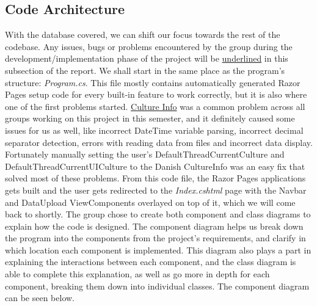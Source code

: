 \documentclass[12pt]{report}
\begin{document}
\subsection*{Code Architecture}
\label{sec:code}
With the database covered, we can shift our focus towards the rest of the codebase. Any issues, bugs or problems encountered
by the group during the development/implementation phase of the project will be \underline{underlined} in this subsection of the report.
We shall start in the same place as the program's structure: \textit{Program.cs}. This file mostly contains
automatically generated Razor Pages setup code for every built-in feature to work correctly, but it is also where one of the first problems started.
\underline{Culture Info} was a common problem across all groups working on this project in this semester, and it definitely caused some issues for us as well,
like incorrect DateTime variable parsing, incorrect decimal separator detection, errors with reading data from files and incorrect data display.
Fortunately manually setting the user's DefaultThreadCurrentCulture and DefaultThreadCurrentUICulture to the Danish CultureInfo
was an easy fix that solved most of these problems. From this code file, the Razor Pages applications gets built and the user gets redirected
to the \textit{Index.cshtml} page with the Navbar and DataUpload ViewComponents overlayed on top of it, which we will come back to shortly.
The group chose to create both component and class diagrams to explain how the code is designed. The component diagram helps us break down
the program into the components from the project's requirements, and clarify in which location each component is implemented.
This diagram also plays a part in explaining the interactions between each component, and the class diagram is able to complete this explanation,
as well as go more in depth for each component, breaking them down into individual classes. The component diagram can be seen below.


\end{document}
